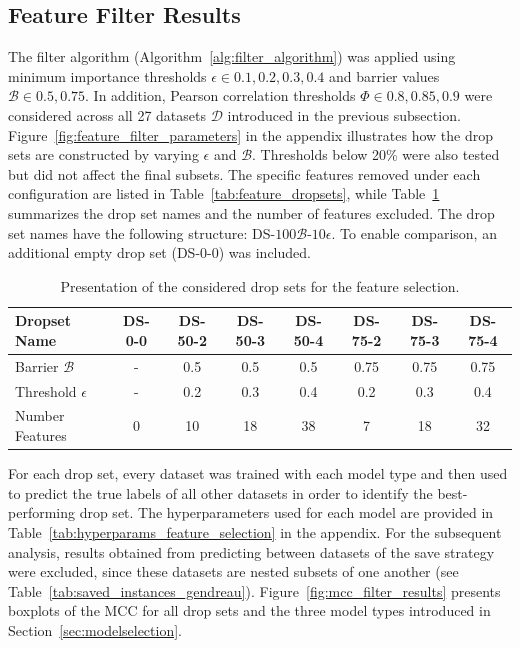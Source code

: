 \subsection{Feature Filter Results}
\label{sec:feature_filter_results}

The filter algorithm (Algorithm~\ref{alg:filter_algorithm}) was applied using minimum importance thresholds $\epsilon \in {0.1, 0.2, 0.3, 0.4}$
and barrier values $\mathcal{B} \in {0.5, 0.75}$. In addition, Pearson correlation thresholds $\Phi \in {0.8, 0.85, 0.9}$ were considered
across all 27 datasets $\mathcal{D}$ introduced in the previous subsection. Figure~\ref{fig:feature_filter_parameters} in the appendix
illustrates how the drop sets are constructed by varying $\epsilon$ and $\mathcal{B}$. Thresholds below 20\% were also tested but
did not affect the final subsets. The specific features removed under each configuration are listed in Table~\ref{tab:feature_dropsets},
while Table~\ref{tab:drop_set_presentation_shortened} summarizes the drop set names and the number of features excluded. The drop set
names have the following structure: DS-$100\mathcal{B}$-$10\epsilon$. To enable
comparison, an additional empty drop set (DS-0-0) was included.

\begin{table}[ht]
	\centering
	\small
	\begin{tabular}{l c c c c c c c}
		\toprule
		Dropset Name          & DS-0-0 & DS-50-2 & DS-50-3 & DS-50-4 & DS-75-2 & DS-75-3 & DS-75-4 \\
		\midrule
		Barrier $\mathcal{B}$ & -      & 0.5     & 0.5     & 0.5     & 0.75    & 0.75    & 0.75    \\
		Threshold $\epsilon$  & -      & 0.2     & 0.3     & 0.4     & 0.2     & 0.3     & 0.4     \\
		Number Features       & 0      & 10      & 18      & 38      & 7       & 18      & 32      \\
		\bottomrule
	\end{tabular}
	\caption{Presentation of the considered drop sets for the feature selection.}
	\label{tab:drop_set_presentation_shortened}
\end{table}
For each drop set, every dataset was trained with each model type and then used to predict the
true labels of all other datasets in order to identify the best-performing drop set. The hyperparameters used for
each model are provided in Table~\ref{tab:hyperparams_feature_selection} in the appendix. For the subsequent analysis,
results obtained from predicting between datasets of the save strategy were excluded, since these datasets are nested
subsets of one another (see Table~\ref{tab:saved_instances_gendreau}). Figure~\ref{fig:mcc_filter_results} presents boxplots of
the \gls{MCC} for all drop sets and the three model types introduced in Section~\ref{sec:modelselection}.

